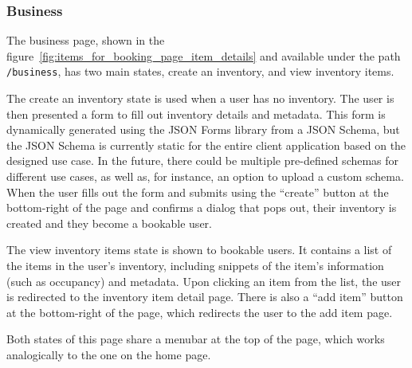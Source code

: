 \subsubsection{Business}

The business page, shown in the figure~\ref{fig:items_for_booking_page_item_details} and available under the path \texttt{/business}, has two main states, create an inventory, and view inventory items.

The create an inventory state is used when a user has no inventory. The user is then presented a form to fill out inventory details and metadata. This form is dynamically generated using the JSON Forms library from a JSON Schema, but the JSON Schema is currently static for the entire client application based on the designed use case. In the future, there could be multiple pre-defined schemas for different use cases, as well as, for instance, an option to upload a custom schema. When the user fills out the form and submits using the \enquote{create} button at the bottom-right of the page and confirms a dialog that pops out, their inventory is created and they become a bookable user.

The view inventory items state is shown to bookable users. It contains a list of the items in the user's inventory, including snippets of the item's information (such as occupancy) and metadata. Upon clicking an item from the list, the user is redirected to the inventory item detail page. There is also a \enquote{add item} button at the bottom-right of the page, which redirects the user to the add item page.

Both states of this page share a menubar at the top of the page, which works analogically to the one on the home page.

